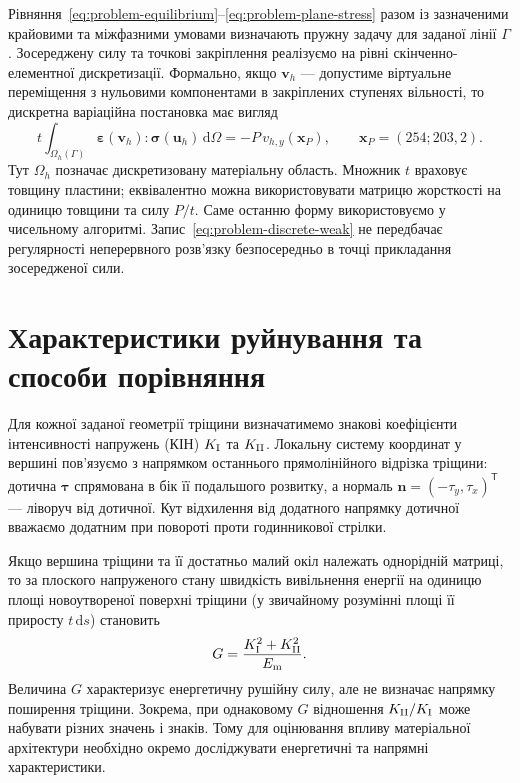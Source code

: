 Рівняння~\eqref{eq:problem-equilibrium}--\eqref{eq:problem-plane-stress} разом із зазначеними крайовими та міжфазними умовами визначають пружну задачу для заданої лінії $\Gamma$. Зосереджену силу та точкові закріплення реалізуємо на рівні скінченно-елементної дискретизації. Формально, якщо $\boldsymbol v_h$ --- допустиме віртуальне переміщення з нульовими компонентами в закріплених ступенях вільності, то дискретна варіаційна постановка має вигляд
\begin{equation}
 t\int_{\Omega_h(\Gamma)}
 \boldsymbol\varepsilon(\boldsymbol v_h):
 \boldsymbol\sigma(\boldsymbol u_h)\,\mathrm d\Omega
 =-P\,v_{h,y}(\boldsymbol x_P),
 \qquad \boldsymbol x_P=(254;203{,}2).
 \label{eq:problem-discrete-weak}
\end{equation}
Тут $\Omega_h$ позначає дискретизовану матеріальну область. Множник $t$ враховує товщину пластини; еквівалентно можна використовувати матрицю жорсткості на одиницю товщини та силу $P/t$. Саме останню форму використовуємо у чисельному алгоритмі. Запис~\eqref{eq:problem-discrete-weak} не передбачає регулярності неперервного розв'язку безпосередньо в точці прикладання зосередженої сили.

\section{Характеристики руйнування та способи порівняння}
\label{sec:problem-observables}
Для кожної заданої геометрії тріщини визначатимемо знакові коефіцієнти інтенсивності напружень (КІН) $K_{\mathrm{I}}$ та $K_{\mathrm{II}}$. Локальну систему координат у вершині пов'язуємо з напрямком останнього прямолінійного відрізка тріщини: дотична $\boldsymbol\tau$ спрямована в бік її подальшого розвитку, а нормаль $\boldsymbol n=(-\tau_y,\tau_x)^{\mathsf T}$ --- ліворуч від дотичної. Кут відхилення від додатного напрямку дотичної вважаємо додатним при повороті проти годинникової стрілки.

Якщо вершина тріщини та її достатньо малий окіл належать однорідній матриці, то за плоского напруженого стану швидкість вивільнення енергії на одиницю площі новоутвореної поверхні тріщини (у звичайному розумінні площі її приросту $t\,\mathrm ds$) становить
\begin{equation}
 G=\frac{K_{\mathrm{I}}^2+K_{\mathrm{II}}^2}{E_{\mathrm m}}.
 \label{eq:problem-G}
\end{equation}
Величина $G$ характеризує енергетичну рушійну силу, але не визначає напрямку поширення тріщини. Зокрема, при однаковому $G$ відношення $K_{\mathrm{II}}/K_{\mathrm{I}}$ може набувати різних значень і знаків. Тому для оцінювання впливу матеріальної архітектури необхідно окремо досліджувати енергетичні та напрямні характеристики.

